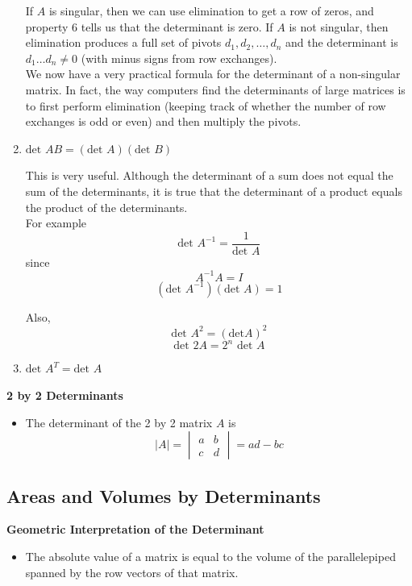 \documentclass[11pt]{article}
\begin{document}
\begin{enumerate}
    If $A$ is singular, then we can use elimination to get a row of zeros, and property 6 
    tells us that the determinant is zero. If $A$ is not singular, then elimination produces a 
    full set of pivots \(d_1, d_2, \ldots, d_n\) and the determinant is $d_1 \ldots d_n \ne 0$
    (with minus signs from row exchanges). \\

    We now have a very practical formula for the determinant of a non-singular matrix. In fact, 
    the way computers find the determinants of large matrices is to first perform elimination 
    (keeping track of whether the number of row exchanges is odd or even) and then multiply 
    the pivots.
    \item $\text{det } AB = (\text{det }A) (\text{det }B)$
    
    This is very useful. Although the determinant of a sum does not equal the sum of the 
    determinants, it is true that the determinant of a product equals the product of the 
    determinants. \\

    For example \[\text{det } A^{-1}= \frac{1}{\text{det } A}\]
    since 
    \[A^{-1}A=I\]
    \[(\text{det }A^{-1}) (\text{det }A)=1\]

    Also, 
    \[\text{det }A^2 = {(\text{det}A)}^2\]
    \[\text{det }2A = 2^n\text{ det }A\]

    \item $\text{det } A^T = \text{det } A$
\end{enumerate}
\textbf{2 by 2 Determinants}
\begin{itemize}
    \item The determinant of the 2 by 2 matrix $A$ is 
    \[
    |A| = \begin{vmatrix}
        a & b \\ 
        c & d 
    \end{vmatrix} = ad - bc   
    \]
\end{itemize}

\subsection{Areas and Volumes by Determinants}

\textbf{Geometric Interpretation of the Determinant}
\begin{itemize}
    \item The absolute value of a matrix is equal to the volume of the parallelepiped spanned
    by the row vectors of that matrix. 
\end{itemize}
\end{document}
